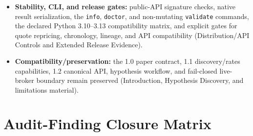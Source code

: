 \documentclass{asrpaper}
\begin{document}
\begin{itemize}[leftmargin=1.2em,itemsep=.20em,topsep=.25em]
\item \textbf{Stability, CLI, and release gates:} public-API signature checks, native result serialization, the \texttt{info}, \texttt{doctor}, and non-mutating \texttt{validate} commands, the declared Python 3.10--3.13 compatibility matrix, and explicit gates for quote repricing, chronology, lineage, and API compatibility (Distribution/API Controls and Extended Release Evidence).
\item \textbf{Compatibility/preservation:} the 1.0 paper contract, 1.1 discovery/rates capabilities, 1.2 canonical API, hypothesis workflow, and fail-closed live-broker boundary remain preserved (Introduction, Hypothesis Discovery, and limitations material).
\end{itemize}


\section{Audit-Finding Closure Matrix}
\end{document}
